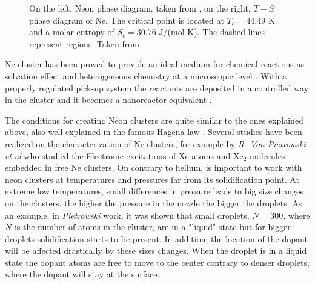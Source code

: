 \begin{figure}[h!]
\centering
\hspace*{\fill}%
\hspace*{\fill}%
\caption[Neon phase-Isentropic diagrams]{On the left, Neon phase diagram. taken from \cite{young_phase_nodate}, on the right, $T-S$ phase diagram of Ne. The critical point is located at $T_{c}= 44.49$ K and a molar entropy of $S_{c}=30.76$ J/(mol K). The dashed lines represent regions. Taken from \cite{christen_supersonic_2010-1} }
\label{fig:Nephases}
\end{figure}

Ne cluster has been proved to provide an ideal medium for chemical reactions as solvation effect and heterogeneous chemistry at a microscopic level \cite{gough_infrared_1985}. With a properly regulated pick-up system the reactants are deposited in a controlled way in the cluster and it becomes a nanoreactor equivalent \cite{gaveau_reaction_2001}.

The conditions for creating Neon clusters are quite similar to the ones explained above, also well explained in the famous Hagena law \cite{hagena_cluster_1972-1}. Several studies have been realized on the characterization of Ne clusters, for example  by \textit{R. Von Pietrowski et al}   \cite{von_pietrowski_fluorescence_1997} who studied the Electronic excitations of Xe atoms and Xe$_{2}$ molecules  embedded in free Ne clusters. On contrary to helium, is important to work with neon clusters at temperatures and pressures far from its solidification point. At extreme low temperatures, small differences in pressure leads to big size changes on the clusters, the higher the pressure in the nozzle the bigger the droplets. As an example, in \textit{Pietrowski} work, it was shown that small droplets, $N=300$, where $N$ is the number of atoms in the cluster, are in a "liquid" state but for bigger droplets solidification starts to be present. In addition, the location of the dopant will be affected drastically by these sizes changes. When the droplet is in a liquid state the dopant atoms are free to move to the center contrary to denser droplets, where the dopant will stay at the surface.


